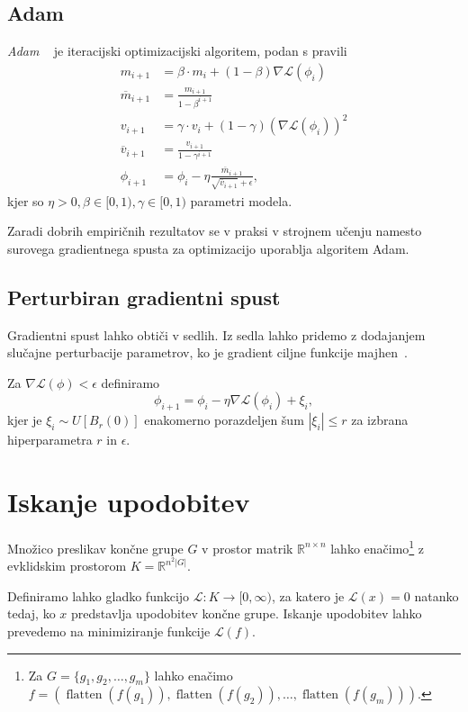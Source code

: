 \documentclass[mat2, tisk]{fmfdelo}
\newcommand{\R}{\mathbb R}
\newcommand{\loss}{\mathcal L}
\begin{document}
\subsection{Adam}
\label{adam}
\emph{Adam} ~\cite[stran
88]{prince2023understandingdeeplearning} je
iteracijski optimizacijski algoritem, podan s pravili
\begin{align*}
  m_{i+1} &= \beta \cdot m_i + (1-\beta) \nabla \loss (\phi_i) \\
  \overline{m}_{i+1} &= \frac{m_{i+1}}{1 - \beta ^{i+1}}\\
  v_{i+1} &= \gamma \cdot v_i + (1-\gamma) (\nabla \loss (\phi_i))^2 \\
  \overline{v}_{i+1} &= \frac{v_{i+1}}{1 - \gamma ^{i+1}}\\
  \phi_{i+1} &= \phi_i -  \eta
  \frac{\overline{m}_{i+1}}{\sqrt{\overline{v}_{i+1}} + \epsilon},
\end{align*}
kjer so $\eta > 0, \beta \in [0,1), \gamma \in
[0,1)$ parametri modela.

Zaradi dobrih empiričnih rezultatov se v praksi v strojnem učenju
namesto surovega gradientnega spusta za optimizacijo uporablja
algoritem Adam.
\subsection{Perturbiran gradientni spust}
\label{subsection:pgd}
Gradientni spust lahko obtiči v sedlih.
Iz sedla lahko pridemo z dodajanjem slučajne perturbacije
parametrov, ko je gradient ciljne funkcije
majhen~\cite{jin2017escapesaddlepointsefficiently}.

Za $\nabla \loss(\phi) < \epsilon$ definiramo
$$
\phi_{i+1} = \phi_i - \eta \nabla \loss(\phi_i) + \xi_i,
$$
kjer je $\xi_i \sim U[B_r(0)]$
enakomerno porazdeljen šum $|\xi_i| \leq r $
za izbrana hiperparametra $r$ in $\epsilon$.
%
\clearpage
\section{Iskanje upodobitev}
\label{section:Iskanje upodobitev}
Množico preslikav končne grupe $G$ v prostor matrik $\R^{n \times n}$ lahko
enačimo\footnote{Za $G=\{g_1, g_2, \dotsc, g_m\}$ lahko
  enačimo $f = (\operatorname{flatten}(f(g_1)),
    \operatorname{flatten}(f(g_2)), \dotsc,
\operatorname{flatten}(f(g_{m}) ))$.} z evklidskim prostorom $K = \R^{n^2 |G|}$.

Definiramo lahko gladko funkcijo $\loss \colon K \to [0,
\infty)$, za katero je $\loss (x) = 0$ natanko tedaj, ko $x$
predstavlja upodobitev končne grupe.
Iskanje upodobitev lahko prevedemo na minimiziranje
funkcije $\loss(f)$.
\end{document}
